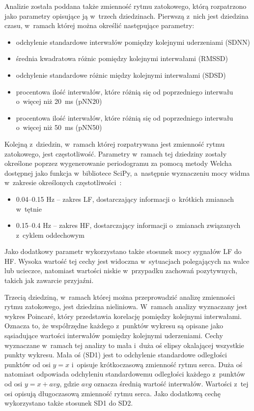 Analizie została poddana także zmienność rytmu zatokowego, którą rozpatrzono jako parametry opisujące ją w~trzech dziedzinach. Pierwszą z~nich jest dziedzina czasu, w~ramach której można określić następujące parametry:
\begin{itemize}
	\item odchylenie standardowe interwałów pomiędzy kolejnymi uderzeniami (SDNN)
	\item średnia kwadratowa różnic pomiędzy kolejnymi interwałami (RMSSD)
	\item odchylenie standardowe różnic między kolejnymi interwałami (SDSD)
	\item procentowa ilość interwałów, które różnią się od poprzedniego interwału o~więcej niż 20~ms (pNN20)
	\item procentowa ilość interwałów, które różnią się od poprzedniego interwału o~więcej niż 50~ms (pNN50)
\end{itemize}
Kolejną z~dziedzin, w~ramach której rozpatrywana jest zmienność rytmu zatokowego, jest częstotliwość. 
Parametry w~ramach tej dziedziny zostały określone poprzez wygenerowanie periodogramu za pomocą metody Welcha~\cite{welch_1967} dostępnej jako funkcja w~bibliotece SciPy, a~następnie wyznaczeniu mocy widma w~zakresie określonych częstotliwości~\cite{hrv_overwiev_2017}:
\begin{itemize}
	\item 0.04--0.15 Hz -- zakres LF, dostarczający informacji o~krótkich zmianach w~tętnie
	\item 0.15--0.4 Hz -- zakres HF, dostarczający informacji o~zmianach związanych z~cyklem oddechowym
\end{itemize}
Jako dodatkowy parametr wykorzystano także stosunek mocy sygnałów LF do HF. Wysoka wartość tej cechy jest widoczna w~sytuacjach polegających na walce lub ucieczce, natomiast wartości niskie w~przypadku zachowań pozytywnych, takich jak zawarcie przyjaźni.

Trzecią dziedziną, w~ramach której można przeprowadzić analizę zmienności rytmu zatokowego, jest dziedzina nieliniowa. W~ramach analizy wyznaczany jest wykres Poincaré, który przedstawia korelację pomiędzy kolejnymi interwałami. Oznacza to, że współrzędne każdego z~punktów wykresu są opisane jako sąsiadujące wartości interwałów pomiędzy kolejnymi uderzeniami. Cechy wyznaczane w~ramach tej analizy to mała i~duża oś elipsy okalającej wszystkie punkty wykresu. Mała oś (SD1) jest to odchylenie standardowe odległości punktów od osi $y=x$ i~opisuje krótkoczasową zmienność rytmu serca. Duża oś natomiast odpowiada odchyleniu standardowemu odległości każdego z~punktów od osi $y=x+avg$, gdzie $avg$ oznacza średnią wartość interwałów. Wartości z~tej osi opisują długoczasową zmienność rytmu serca. Jako dodatkową cechę wykorzystano także stosunek SD1 do SD2.

